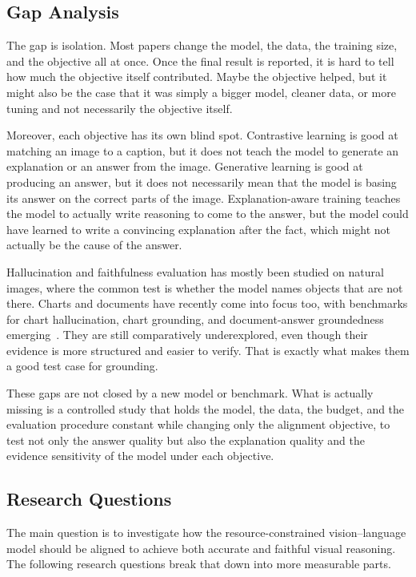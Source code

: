 \documentclass[preprint,12pt]{elsarticle}
\begin{document}
\subsection{Gap Analysis}
The gap is isolation.
Most papers change the model, the data, the training size, and the objective all at once.
Once the final result is reported, it is hard to tell how much the objective itself contributed.
Maybe the objective helped, but it might also be the case that it was simply a bigger model, cleaner data, or more tuning and not necessarily the objective itself.

Moreover, each objective has its own blind spot.
Contrastive learning is good at matching an image to a caption, but it does not teach the model to generate an explanation or an answer from the image.
Generative learning is good at producing an answer, but it does not necessarily mean that the model is basing its answer on the correct parts of the image.
Explanation-aware training teaches the model to actually write reasoning to come to the answer, but the model could have learned to write a convincing explanation after the fact,
which might not actually be the cause of the answer.

Hallucination and faithfulness evaluation has mostly been studied on natural images, where the common test is whether the model names objects that are not there.
Charts and documents have recently come into focus too, with benchmarks for chart hallucination, chart grounding, and document-answer groundedness emerging~\cite{wang2025charthal,bansal2025chartab,chen2025docqa}.
They are still comparatively underexplored, even though their evidence is more structured and easier to verify.
That is exactly what makes them a good test case for grounding.

These gaps are not closed by a new model or benchmark. What is actually missing is a controlled study that holds the model, the data, the budget, 
and the evaluation procedure constant while changing only the alignment objective, to test not only the answer quality but also the explanation quality and the evidence sensitivity of the model under each objective.


\subsection{Research Questions}
The main question is to investigate how the resource-constrained vision--language model should be aligned to achieve both accurate and faithful visual reasoning.
The following research questions break that down into more measurable parts.
\end{document}
